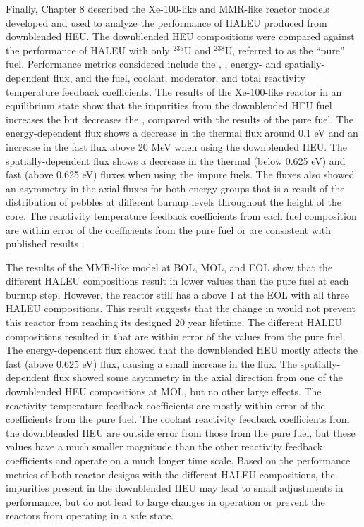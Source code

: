 Finally, Chapter 8 described the Xe-100-like and 
\gls{MMR}-like reactor models developed and 
used to analyze the performance of \gls{HALEU} produced from 
downblended \gls{HEU}. The downblended \gls{HEU} compositions 
were compared against the performance of \gls{HALEU} with only 
$^{235}$U and $^{238}$U, referred to as the ``pure'' fuel. 
Performance metrics considered include the 
\keff, \betaEff, energy- and spatially-dependent flux, and 
the fuel, coolant, moderator, and total reactivity temperature 
feedback coefficients. The results of the Xe-100-like 
reactor in an equilibrium state show that the impurities from 
the downblended 
\gls{HEU} fuel increases the \keff but decreases the \betaEff, 
compared with the results of the pure fuel. 
The energy-dependent flux shows a decrease in the thermal flux 
around 0.1 eV and an increase in the fast flux above 20 MeV 
when using the downblended \gls{HEU}. The spatially-dependent 
flux shows a decrease in the thermal (below 0.625 eV) and 
fast (above 0.625 eV) fluxes when using the impure fuels. 
The fluxes also showed an asymmetry 
in the axial fluxes for both energy groups that is 
a result of the distribution of pebbles at different burnup levels 
throughout the height of the core. The reactivity temperature 
feedback coefficients from each fuel composition are within 
error of the coefficients from the pure fuel or are consistent 
with published results \cite{mulder_neutronics_2020}.

The results of the \gls{MMR}-like model at \gls{BOL}, \gls{MOL}, 
and \gls{EOL} show that the different \gls{HALEU} compositions 
result in lower \keff values than the pure fuel at each burnup 
step. However, 
the reactor still has a \keff above 1 at the \gls{EOL} with all 
three \gls{HALEU} compositions. 
This result suggests that the change in \keff would not prevent this 
reactor from reaching its designed 20 year lifetime. The 
different \gls{HALEU} compositions resulted in \betaEff that 
are within error of the values from the pure fuel. The 
energy-dependent 
flux showed that the downblended \gls{HEU} mostly affects 
the fast (above 0.625 eV) flux, causing a small increase in 
the flux. The spatially-dependent flux showed some 
asymmetry in the axial direction from one of the downblended 
\gls{HEU} compositions at \gls{MOL}, but no other large 
effects. The reactivity temperature feedback coefficients 
are mostly within error of the coefficients from the pure fuel. 
The coolant reactivity feedback coefficients from the downblended 
\gls{HEU} are outside error from those from the pure fuel, 
but these values have a much smaller magnitude than the other 
reactivity feedback coefficients and operate on a much 
longer time scale. Based on the performance metrics of 
both reactor designs with the different \gls{HALEU} 
compositions, the impurities present in the downblended 
\gls{HEU} may lead to small adjustments in performance, but do 
not lead to large changes in operation or prevent the 
reactors from operating in a safe state. 
 
